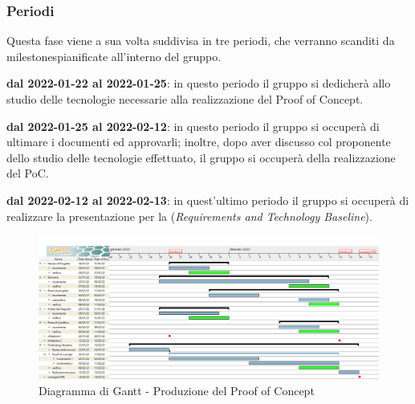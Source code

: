 \subsubsection{Periodi}

Questa fase viene a sua volta suddivisa in tre periodi, che verranno scanditi da milestones\glo pianificate all'interno del gruppo.

\textbf{dal 2022-01-22 al 2022-01-25}: in questo periodo il gruppo si dedicherà allo studio delle tecnologie necessarie alla realizzazione del Proof of Concept.

\textbf{dal 2022-01-25 al 2022-02-12}: in questo periodo il gruppo si occuperà di ultimare i documenti ed approvarli; inoltre, dopo aver discusso col proponente dello studio delle tecnologie effettuato, il gruppo si occuperà della realizzazione del PoC.

\textbf{dal 2022-02-12 al 2022-02-13}: in quest'ultimo periodo il gruppo si occuperà di realizzare la presentazione per la (\textit{Requirements and Technology Baseline}).


\begin{figure}[H]
    \centering
    \includegraphics[scale=0.30]{Sezioni/gantt/TB.png}
    \caption{Diagramma di Gantt - Produzione del Proof of Concept}
\end{figure}
